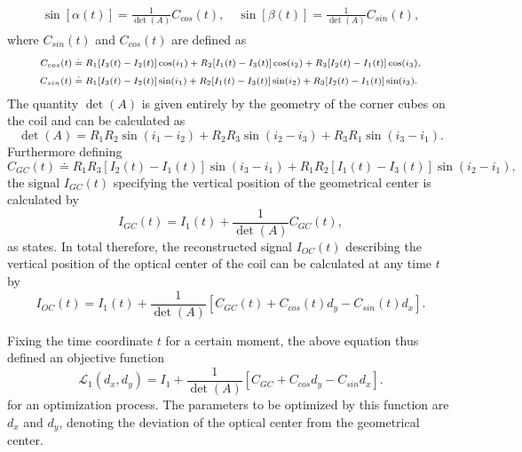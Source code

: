 \documentclass{report}
\numberwithin{tm}{section}
\begin{document}
\begin{align}
	\begin{aligned}
		\sin[\alpha(t)] = \frac{1}{\det(A)}C_{cos}(t), \quad \sin[\beta(t)] = \frac{1}{\det(A)}C_{sin}(t),
	\end{aligned}
\end{align} where $C_{sin}(t)$ and $C_{cos}(t)$ are defined as \begin{align}\scriptsize
	\begin{aligned}
		C_{cos}(t) &\doteq R_1[I_3(t)-I_2(t)]\cos(i_1) + R_2[I_1(t)-I_3(t)]\cos(i_2)  + R_3[I_2(t)-I_1(t)]\cos(i_3), \\
		C_{sin}(t) &\doteq R_1[I_3(t)-I_2(t)]\sin(i_1) + R_2[I_1(t)-I_3(t)]\sin(i_2) + R_3[I_2(t)-I_1(t)]\sin(i_3).
	\end{aligned}
\end{align} The quantity $\det(A)$ is given entirely by the geometry of the corner cubes on the coil and can be calculated as \begin{equation}
	\det(A) = R_1R_2\sin(i_1-i_2) + R_2R_3\sin(i_2-i_3) + R_3R_1\sin(i_3-i_1).
\end{equation} Furthermore defining \begin{equation}
	C_{GC}(t) \doteq R_1R_3[I_2(t)-I_1(t)]\sin(i_3-i_1) + R_1R_2[I_1(t)-I_3(t)]\sin(i_2-i_1),
\end{equation} the signal $I_{GC}(t)$ specifying the vertical position of the geometrical center is calculated by \begin{equation}
	I_{GC}(t) = I_1(t) + \frac{1}{\det(A)}C_{GC}(t),
\end{equation} as \cite[p.10]{Glardon.2024} states. In total therefore, the reconstructed signal $I_{OC}(t)$ describing the vertical position of the optical center of the coil can be calculated at any time $t$ by \begin{equation}\label{eq:objective_function_dxdy}
	I_{OC}(t) = I_1(t) + \frac{1}{\det(A)}\left[C_{GC}(t) + C_{cos}(t)d_y - C_{sin}(t)d_x\right].
\end{equation}

Fixing the time coordinate $t$ for a certain moment, the above equation thus defined an objective function 
\begin{equation}\label{eq:to_optimize_dxdy}
	\mathcal{L}_{1}(d_x, d_y) = I_1 + \frac{1}{\det(A)}[C_{GC} + C_{cos}d_y - C_{sin}d_x].
\end{equation}
for an optimization process. The parameters to be optimized by this function are $d_x$ and $d_y$, denoting the deviation of the optical center from the geometrical center.
\end{document}
